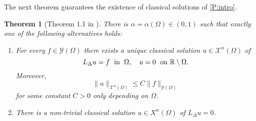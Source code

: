 \documentclass[11 pt]{article}
\newtheorem{theorem}{Theorem}[section]
\numberwithin{equation}{section}
\def\R{\mathbb{R}}
\begin{document}
The next theorem guarantees the existence of classical solutions of \eqref{P:intro}.

\begin{theorem}[Theorem 1.1 in \cite{CS22}]\label{eq:regularity}
    There is $\alpha=\alpha(\Omega)\in(0,1)$ such that exactly one of the following alternatives holds:
    \begin{enumerate}[label=\roman*)]
        \item For every $f\in\mathcal Y(\Omega)$ there exists a unique classical solution $u\in\mathcal X^{\alpha}(\Omega)$ of
        \begin{equation}\label{eq:log_problem}
            L_{\Delta} u = f \;\textnormal{ in }\; \Omega, \quad u=0 \;\textnormal{ on } \R\setminus \Omega.
        \end{equation}
        Moreover,
        \begin{equation}\label{eq:regularity_classical}
            \|u\|_{\mathcal X^{\alpha}(\Omega)}\leq C\|f\|_{\mathcal Y(\Omega)}
        \end{equation}
        for some constant $C>0$ only depending on $\Omega$.
        \item There is a non-trivial classical solution $u\in X^{\alpha}(\Omega)$ of $L_{\Delta} u=0$.
    \end{enumerate}
\end{theorem}
\end{document}
